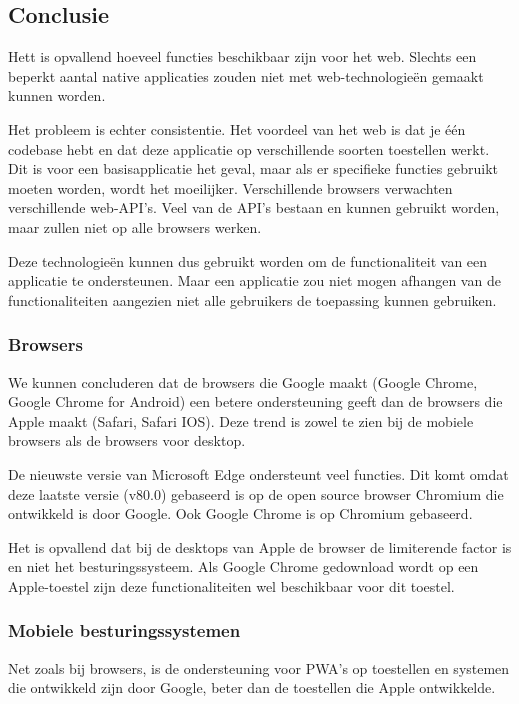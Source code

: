\clearpage
\subsection{Conclusie}

Hett is opvallend hoeveel functies beschikbaar zijn voor het web. Slechts een beperkt aantal native applicaties zouden niet met web-technologieën gemaakt kunnen worden.

Het probleem is echter consistentie. Het voordeel van het web is dat je één codebase hebt en dat deze applicatie op verschillende soorten toestellen werkt. Dit is voor een basisapplicatie het geval, maar als er specifieke functies gebruikt moeten worden, wordt het moeilijker. Verschillende browsers verwachten verschillende web-API’s. Veel van de API’s bestaan en kunnen gebruikt worden, maar zullen niet op alle browsers werken.

Deze technologieën kunnen dus gebruikt worden om de functionaliteit van een applicatie te ondersteunen. Maar een applicatie zou niet mogen afhangen van de functionaliteiten aangezien niet alle gebruikers de toepassing kunnen gebruiken.



\subsubsection{Browsers}

We kunnen concluderen dat de browsers die Google maakt (Google Chrome, Google Chrome for Android) een betere ondersteuning geeft dan de browsers die Apple maakt (Safari, Safari IOS). Deze trend is zowel te zien bij de mobiele browsers als de browsers voor desktop.

De nieuwste versie van Microsoft Edge ondersteunt veel functies. Dit komt omdat deze laatste versie (v80.0) gebaseerd is op de open source browser Chromium die ontwikkeld is door Google. Ook Google Chrome is op Chromium gebaseerd.

Het is opvallend dat bij de desktops van Apple de browser de limiterende factor is en niet het besturingssysteem. Als Google Chrome gedownload wordt op een Apple-toestel zijn deze functionaliteiten wel beschikbaar voor dit toestel.


\subsubsection{Mobiele besturingssystemen }

Net zoals bij browsers, is de ondersteuning voor PWA’s op toestellen en systemen die ontwikkeld zijn door Google, beter dan de toestellen die Apple ontwikkelde.

